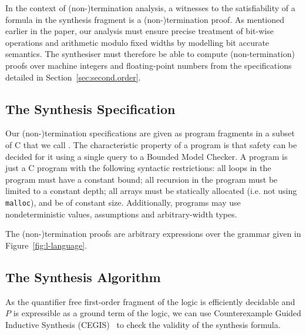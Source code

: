 

In the context of (non-)termination analysis, a witnesses to the satisfiability of a formula in the synthesis fragment 
is a (non-)termination proof. 
As mentioned earlier in the paper, our analysis must ensure precise treatment of bit-wise operations and arithmetic modulo fixed widths
by modelling bit accurate semantics.
The synthesiser must therefore be able to compute (non-termination) proofs 
over machine integers and floating-point numbers from the specifications detailed in Section~\ref{sec:second.order}.


\subsection{The Synthesis Specification}
Our (non-)termination specifications are given as program fragments
in a subset of C that we call \newC.  
The characteristic property of a \newC  program is that safety can be decided for
it using a single query to a Bounded Model Checker.  A \newC program is
just a C program with the following syntactic restrictions:
 all loops in the program must have a constant bound;
 all recursion in the program must be limited to a constant depth;
 all arrays must be statically allocated (i.e. not using \texttt{malloc}),
 and be of constant size.
Additionally, \newC programs may use nondeterministic values, assumptions
and arbitrary-width types.

The (non-)termination proofs are arbitrary expressions over the grammar given in Figure~\ref{fig:l-language}.  


\subsection{The Synthesis Algorithm}
As the quantifier free first-order fragment of the logic is efficiently decidable and
$P$ is expressible as a ground term of the logic, we can use
Counterexample Guided Inductive Synthesis (CEGIS)~\cite{lezama-thesis,sketch} to
check the validity of the synthesis formula. 

